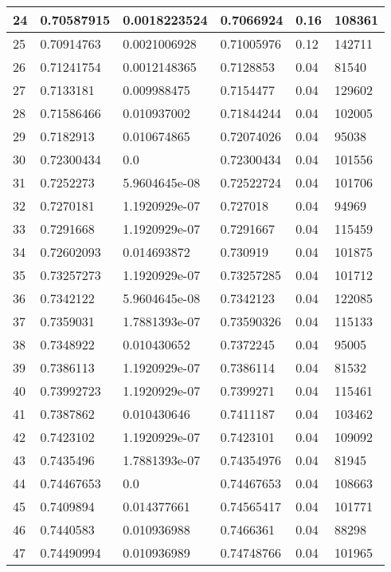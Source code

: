 \begin{longtable}{|l|l|l|l|l|l|}
24 & 0.70587915 & 0.0018223524 & 0.7066924 & 0.16 & 108361 \\ \hline 
25 & 0.70914763 & 0.0021006928 & 0.71005976 & 0.12 & 142711 \\ \hline 
26 & 0.71241754 & 0.0012148365 & 0.7128853 & 0.04 & 81540 \\ \hline 
27 & 0.7133181 & 0.009988475 & 0.7154477 & 0.04 & 129602 \\ \hline 
28 & 0.71586466 & 0.010937002 & 0.71844244 & 0.04 & 102005 \\ \hline 
29 & 0.7182913 & 0.010674865 & 0.72074026 & 0.04 & 95038 \\ \hline 
30 & 0.72300434 & 0.0 & 0.72300434 & 0.04 & 101556 \\ \hline 
31 & 0.7252273 & 5.9604645e-08 & 0.72522724 & 0.04 & 101706 \\ \hline 
32 & 0.7270181 & 1.1920929e-07 & 0.727018 & 0.04 & 94969 \\ \hline 
33 & 0.7291668 & 1.1920929e-07 & 0.7291667 & 0.04 & 115459 \\ \hline 
34 & 0.72602093 & 0.014693872 & 0.730919 & 0.04 & 101875 \\ \hline 
35 & 0.73257273 & 1.1920929e-07 & 0.73257285 & 0.04 & 101712 \\ \hline 
36 & 0.7342122 & 5.9604645e-08 & 0.7342123 & 0.04 & 122085 \\ \hline 
37 & 0.7359031 & 1.7881393e-07 & 0.73590326 & 0.04 & 115133 \\ \hline 
38 & 0.7348922 & 0.010430652 & 0.7372245 & 0.04 & 95005 \\ \hline 
39 & 0.7386113 & 1.1920929e-07 & 0.7386114 & 0.04 & 81532 \\ \hline 
40 & 0.73992723 & 1.1920929e-07 & 0.7399271 & 0.04 & 115461 \\ \hline 
41 & 0.7387862 & 0.010430646 & 0.7411187 & 0.04 & 103462 \\ \hline 
42 & 0.7423102 & 1.1920929e-07 & 0.7423101 & 0.04 & 109092 \\ \hline 
43 & 0.7435496 & 1.7881393e-07 & 0.74354976 & 0.04 & 81945 \\ \hline 
44 & 0.74467653 & 0.0 & 0.74467653 & 0.04 & 108663 \\ \hline 
45 & 0.7409894 & 0.014377661 & 0.74565417 & 0.04 & 101771 \\ \hline 
46 & 0.7440583 & 0.010936988 & 0.7466361 & 0.04 & 88298 \\ \hline 
47 & 0.74490994 & 0.010936989 & 0.74748766 & 0.04 & 101965 \\ \hline 

\end{longtable}
